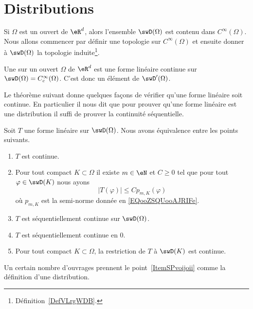 \section{Distributions}

Si \( \Omega\) est un ouvert de \( \eR^d\), alors l'ensemble \( \swD(\Omega)\) est contenu dans \(  C^{\infty}(\Omega)\). Nous allons commencer par définir une topologie sur \(  C^{\infty}(\Omega)\) et ensuite donner à \( \swD(\Omega)\) la topologie induite\footnote{Définition~\ref{DefVLrgWDB}.}.

\begin{definition}[Distribution]    \label{DefPZDtWVP}
    Une  sur un ouvert \( \Omega\) de \( \eR^d\) est une forme linéaire continue sur \(\swD(\Omega)= C^{\infty}_c(\Omega)\). C'est donc un élément de \( \swD'(\Omega)\).
\end{definition}

Le théorème suivant donne quelques façons de vérifier qu'une forme linéaire soit continue. En particulier il nous dit que pour prouver qu'une forme linéaire est une distribution il suffi de prouver la continuité séquentielle.
\begin{theorem} \label{ThoVDDBnVn}
    Soit \( T\) une forme linéaire sur \( \swD(\Omega)\). Nous avons équivalence entre les points suivants.
    \begin{enumerate}
        \item
            \( T\) est continue.
        \item   \label{ItemSPvoijoii}
            Pour tout compact \( K\subset \Omega\) il existe \( m\in \eN\) et \( C\geq 0\) tel que pour tout \( \varphi\in\swD(K)\) nous ayons
            \begin{equation}
                \big| T(\varphi) \big|\leq C p_{m,K}(\varphi)
            \end{equation}
            où \( p_{m,K}\) est la semi-norme donnée en \eqref{EQooZSQUooAJRIFe}.
        \item
            \( T\) est séquentiellement continue sur \( \swD(\Omega)\).
        \item
            \( T\) est séquentiellement continue en \( 0\).
        \item
            Pour tout compact \( K\subset \Omega\), la restriction de \( T\) à \( \swD(K)\) est continue.
    \end{enumerate}
\end{theorem}
Un certain nombre d'ouvrages prennent le point~\ref{ItemSPvoijoii} comme la définition d'une distribution.

